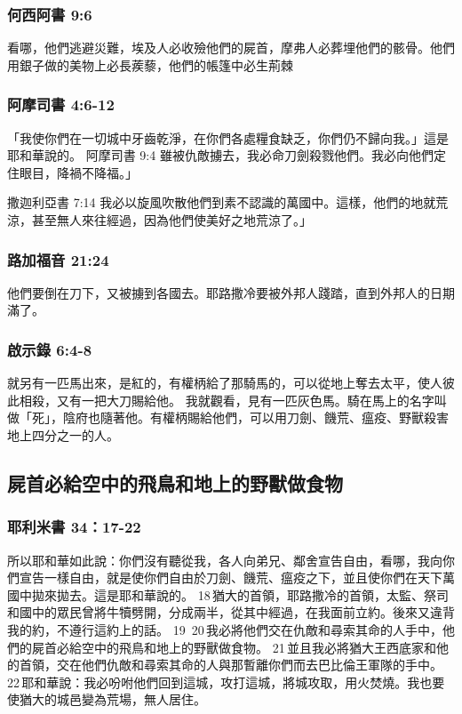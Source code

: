 \subsubsection{何西阿書 9:6}
看哪，他們逃避災難，埃及人必收殮他們的屍首，摩弗人必葬埋他們的骸骨。他們用銀子做的美物上必長蒺藜，他們的帳篷中必生荊棘

\subsubsection{阿摩司書 4:6-12}
「我使你們在一切城中牙齒乾淨，在你們各處糧食缺乏，你們仍不歸向我。」這是耶和華說的。
阿摩司書 9:4
雖被仇敵擄去，我必命刀劍殺戮他們。我必向他們定住眼目，降禍不降福。」

撒迦利亞書 7:14
我必以旋風吹散他們到素不認識的萬國中。這樣，他們的地就荒涼，甚至無人來往經過，因為他們使美好之地荒涼了。」

\subsubsection{路加福音 21:24}
他們要倒在刀下，又被擄到各國去。耶路撒冷要被外邦人踐踏，直到外邦人的日期滿了。


\subsubsection{啟示錄 6:4-8}
就另有一匹馬出來，是紅的，有權柄給了那騎馬的，可以從地上奪去太平，使人彼此相殺，又有一把大刀賜給他。
我就觀看，見有一匹灰色馬。騎在馬上的名字叫做「死」，陰府也隨著他。有權柄賜給他們，可以用刀劍、饑荒、瘟疫、野獸殺害地上四分之一的人。


\subsection{屍首必給空中的飛鳥和地上的野獸做食物}
\subsubsection{耶利米書 34：17-22}
所以耶和華如此說：你們沒有聽從我，各人向弟兄、鄰舍宣告自由，看哪，我向你們宣告一樣自由，就是使你們自由於刀劍、饑荒、瘟疫之下，並且使你們在天下萬國中拋來拋去。這是耶和華說的。 18 猶大的首領，耶路撒冷的首領，太監、祭司和國中的眾民曾將牛犢劈開，分成兩半，從其中經過，在我面前立約。後來又違背我的約，不遵行這約上的話。 19  20 我必將他們交在仇敵和尋索其命的人手中，他們的屍首必給空中的飛鳥和地上的野獸做食物。 21 並且我必將猶大王西底家和他的首領，交在他們仇敵和尋索其命的人與那暫離你們而去巴比倫王軍隊的手中。 22 耶和華說：我必吩咐他們回到這城，攻打這城，將城攻取，用火焚燒。我也要使猶大的城邑變為荒場，無人居住。

